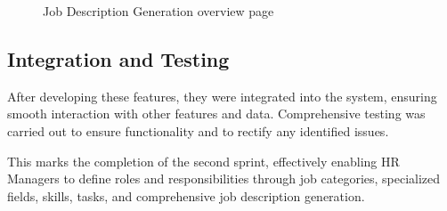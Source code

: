 \begin{figure}[H]
    \centering
    \caption{ Job Description Generation overview page}
    \label{fig:Job-Description-Generation-overview-page}
\end{figure}


\subsection{Integration and Testing}
After developing these features, they were integrated into the system, ensuring smooth interaction with other features and data. Comprehensive testing was carried out to ensure functionality and to rectify any identified issues.

This marks the completion of the second sprint, effectively enabling HR Managers to define roles and responsibilities through job categories, specialized fields, skills, tasks, and comprehensive job description generation.


